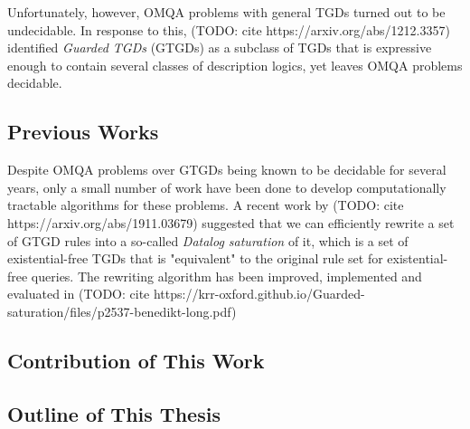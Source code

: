 \documentclass[12pt]{article}
\begin{document}
Unfortunately, however, OMQA problems with general TGDs turned out to be undecidable. In response to this, (TODO: cite https://arxiv.org/abs/1212.3357) identified \emph{Guarded TGDs} (GTGDs) as a subclass of TGDs that is expressive enough to contain several classes of description logics, yet leaves OMQA problems decidable.

\subsection{Previous Works}

Despite OMQA problems over GTGDs being known to be decidable for several years, only a small number of work have been done to develop computationally tractable algorithms for these problems. A recent work by (TODO: cite https://arxiv.org/abs/1911.03679) suggested that we can efficiently rewrite a set of GTGD rules into a so-called \emph{Datalog saturation} of it, which is a set of existential-free TGDs that is "equivalent" to the original rule set for existential-free queries. The rewriting algorithm has been improved, implemented and evaluated in (TODO: cite https://krr-oxford.github.io/Guarded-saturation/files/p2537-benedikt-long.pdf)

\subsection{Contribution of This Work}


\subsection{Outline of This Thesis}
\end{document}
